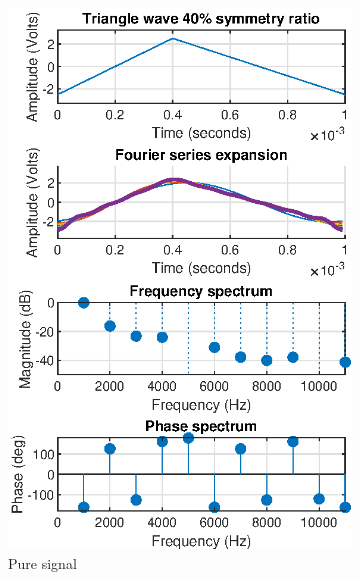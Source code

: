 \documentclass[notitlepage, a4paper, 11pt]{article}
\begin{document}
	\begin{figure}[H]
		\centering
		\begin{subfigure}[][][t]{0.26\textwidth}
			\includegraphics[width=\textwidth]{../Matlab/img/tri40}
			\caption{Pure signal}
		\end{subfigure}
		\hfill
		\begin{subfigure}[][][t]{0.26\textwidth}

\end{subfigure}
\end{figure}
\end{document}
